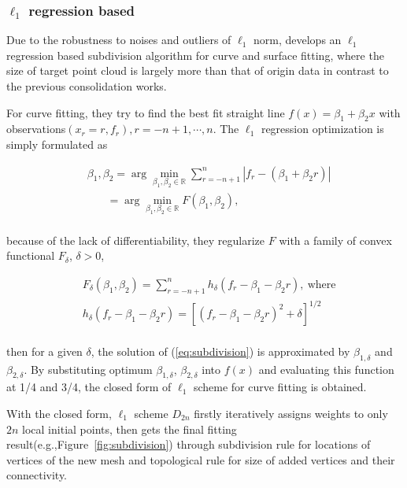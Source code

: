 \subsubsection{$\ell_1$ regression based}
Due to the robustness to noises and outliers of $\ell_1$ norm,
\cite{mustafa2014subdivision} develops an $\ell_1$ regression based subdivision algorithm for curve and surface fitting, 
where the size of target point cloud is largely more than that of origin data in contrast to the previous consolidation works.

For curve fitting, they try to find the best fit straight line $f(x)=\beta_1+\beta_2 x$ with observations$(x_r=r, f_r),r=-n+1,\cdots,n$.
The $\ell_1$ regression optimization is simply formulated as

\small{
\begin{equation}
 \label{eq:subdivision}
 \begin{split}
 &\beta_1, \beta_2 = \arg \min_{\beta_1,\beta_2\in\mathbb{R}}  \sum_{r=-n+1}^{n}  | f_r - (\beta_1 + \beta_2 r) |\\
 &~~~~~~~~=\arg \min_{\beta_1,\beta_2\in\mathbb{R}} F(\beta_1,\beta_2),
 \end{split}
\end{equation}
}
\\
because of the lack of differentiability, they regularize $F$ with a family of convex functional $F_{\delta}$, $\delta>0$,

\small{
\begin{equation}
 \label{eq:subdivision regularization}
 \begin{split}
 &F_{\delta}(\beta_1, \beta_2) = \sum_{r=-n+1}^{n}  h_{\delta}( f_r -\beta_1 - \beta_2 r),~\textrm{where}\\
 &h_{\delta}( f_r -\beta_1 - \beta_2 r) = [( f_r -\beta_1 - \beta_2 r)^2+\delta]^{1/2}
 \end{split}
\end{equation}
}
\\
then for a given $\delta$, the solution of (\ref{eq:subdivision}) is approximated by $\beta_{1,\delta}$ and $\beta_{2,\delta}$.
By substituting optimum $\beta_{1,\delta}$, $\beta_{2,\delta}$ into $f(x)$ and evaluating this function at 1/4 and 3/4,
the closed form of $\ell_1$ scheme for curve fitting is obtained.

With the closed form, $\ell_1$ scheme $D_{2n}$ firstly iteratively assigns weights to only $2n$ local initial points,
then gets the final fitting result(e.g.,Figure~\ref{fig:subdivision}) through subdivision rule for locations of vertices of the new mesh
and topological rule for size of added vertices and their connectivity.


